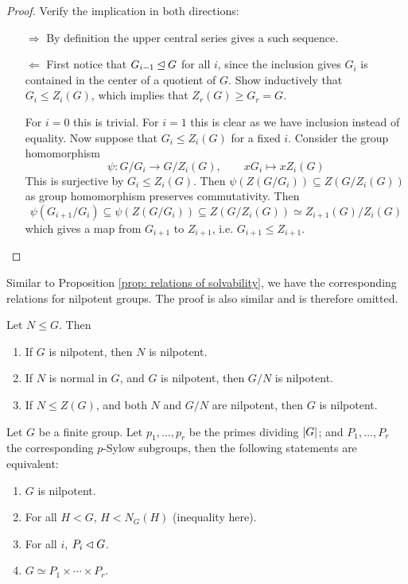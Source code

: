 \begin{proof}
    Verify the implication in both directions:
    \begin{enumerate}
        \item[$\Rightarrow$] By definition the upper central series gives a such sequence.
        \item[$\Leftarrow$] First notice that $G_{i-1} \unlhd G$ for all $i$, since the inclusion gives $G_i$ is contained in the center of a quotient of $G$. Show inductively that $G_i \leq Z_i(G)$, which implies that $Z_r(G) \geq G_r = G$.
        
        For $i = 0$ this is trivial. For $i = 1$ this is clear as we have inclusion instead of equality. Now suppose that $G_i \leq Z_i(G)$ for a fixed $i$. Consider the group homomorphism
        \[
            \psi: G/G_i \to G/Z_i(G), \qquad x G_i \mapsto x Z_i(G)
        \]
        This is surjective by $G_i \leq Z_i(G)$. Then $\psi(Z(G/G_i)) \subseteq Z(G/Z_i(G))$ as group homomorphism preserves commutativity. Then
        \[
            \psi(G_{i+1}/G_i) \subseteq \psi(Z(G/G_i)) \subseteq Z(G/Z_i(G)) \simeq Z_{i+1}(G)/Z_i(G)
        \]
        which gives a map from $G_{i+1}$ to $Z_{i+1}$, i.e. $G_{i+1} \leq Z_{i+1}$.
    \end{enumerate}
\end{proof}

Similar to Proposition \ref{prop: relations of solvability}, we have the corresponding relations for nilpotent groups. The proof is also similar and is therefore omitted.

\begin{proposition}\label{prop: relations of nilpotent}
    Let $N \leq G$. Then
    \begin{enumerate}[label=\roman*)]
        \item If $G$ is nilpotent, then $N$ is nilpotent. 
        \item If $N$ is normal in $G$, and $G$ is nilpotent, then $G/N$ is nilpotent.
        \item If $N \leq Z(G)$, and both $N$ and $G/N$ are nilpotent, then $G$ is nilpotent.
    \end{enumerate}
\end{proposition}

\begin{theorem}
    Let $G$ be a finite group. Let $p_1, \dots, p_r$ be the primes dividing $\left|G\right|$; and $P_1, \dots, P_r$ the corresponding $p$-Sylow subgroups, then the following statements are equivalent:
    \begin{enumerate}[label=\arabic*)]
        \item $G$ is nilpotent.
        \item For all $H < G$, $H < N_G(H)$ (inequality here).
        \item For all $i$, $P_i \lhd G$.
        \item $G \simeq P_1 \times \cdots \times P_r$.
    \end{enumerate}
\end{theorem}

